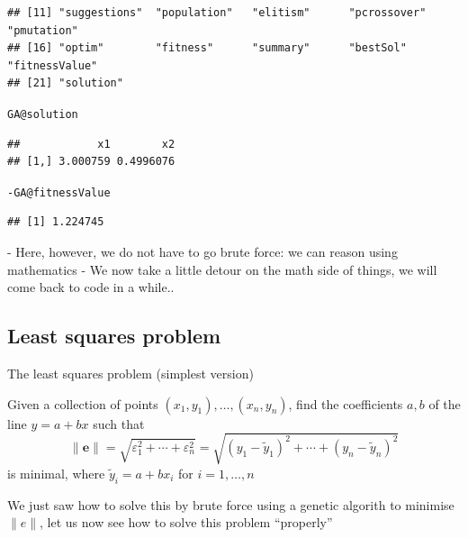 \documentclass[aspectratio=169]{beamer}\usepackage[]{graphicx}\usepackage[]{xcolor}
\makeatletter
\newcommand{\hlopt}[1]{\textcolor[rgb]{0,0,0}{#1}}%
\newcommand{\hldef}[1]{\textcolor[rgb]{0.345,0.345,0.345}{#1}}%
\newcommand{\hlkwc}[1]{\textcolor[rgb]{0.333,0.667,0.333}{#1}}%
\newenvironment{kframe}{%
 \def\at@end@of@kframe{}%
 \ifinner\ifhmode%
  \def\at@end@of@kframe{\end{minipage}}%
  \begin{minipage}{\columnwidth}%
 \fi\fi%
 \def\FrameCommand##1{\hskip\@totalleftmargin \hskip-\fboxsep
 \colorbox{shadecolor}{##1}\hskip-\fboxsep
     \hskip-\linewidth \hskip-\@totalleftmargin \hskip\columnwidth}%
 \MakeFramed {\advance\hsize-\width
   \@totalleftmargin\z@ \linewidth\hsize
   \@setminipage}}%
 {\par\unskip\endMakeFramed%
 \at@end@of@kframe}
\newenvironment{knitrout}{}{} %
\makeatother
\begin{document}
\begin{frame}[fragile]
\begin{knitrout}
\begin{kframe}
\begin{verbatim}
## [11] "suggestions"  "population"   "elitism"      "pcrossover"   "pmutation"   
## [16] "optim"        "fitness"      "summary"      "bestSol"      "fitnessValue"
## [21] "solution"
\end{verbatim}
\begin{alltt}
\hldef{GA}\hlopt{@}\hlkwc{solution}
\end{alltt}
\begin{verbatim}
##            x1        x2
## [1,] 3.000759 0.4996076
\end{verbatim}
\begin{alltt}
\hlopt{-}\hldef{GA}\hlopt{@}\hlkwc{fitnessValue}
\end{alltt}
\begin{verbatim}
## [1] 1.224745
\end{verbatim}
\end{kframe}
\end{knitrout}

- Here, however, we do not have to go brute force: we can reason using mathematics
- We now take a little detour on the math side of things, we will come back to code in a while..
\end{frame}



\subsection{Least squares problem}

\begin{frame}{The least squares problem (simplest version)}
	\begin{definition}
		Given a collection of points $(x_1,y_1),\ldots,(x_n,y_n)$, find the coefficients $a,b$ of the line $y=a+bx$ such that
		$$
		\|\mathbf{e}\|=\sqrt{\varepsilon_1^2+\cdots+\varepsilon_n^2}
		=\sqrt{(y_1-\tilde y_1)^2+\cdots+(y_n-\tilde y_n)^2}
		$$
		is minimal, where $\tilde y_i=a+bx_i$ for $i=1,\ldots,n$
	\end{definition}
	\vfill
	We just saw how to solve this by brute force using a genetic algorith to minimise $\|e\|$, let us now see how to solve this problem ``properly''
\end{frame}
\end{document}
